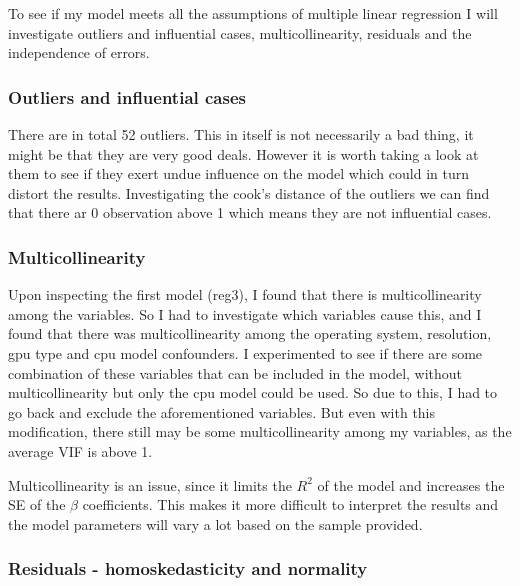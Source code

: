 \documentclass[
]{article}
\begin{document}
To see if my model meets all the assumptions of multiple linear
regression I will investigate outliers and influential cases,
multicollinearity, residuals and the independence of errors.

\hypertarget{outliers-and-influential-cases}{%
\subsubsection{Outliers and influential
cases}\label{outliers-and-influential-cases}}

There are in total 52 outliers. This in itself is not necessarily a bad
thing, it might be that they are very good deals. However it is worth
taking a look at them to see if they exert undue influence on the model
which could in turn distort the results. Investigating the cook's
distance of the outliers we can find that there ar 0 observation above 1
which means they are not influential cases.

\hypertarget{multicollinearity}{%
\subsubsection{Multicollinearity}\label{multicollinearity}}

Upon inspecting the first model (reg3), I found that there is
multicollinearity among the variables. So I had to investigate which
variables cause this, and I found that there was multicollinearity among
the operating system, resolution, gpu type and cpu model confounders. I
experimented to see if there are some combination of these variables
that can be included in the model, without multicollinearity but only
the cpu model could be used. So due to this, I had to go back and
exclude the aforementioned variables. But even with this modification,
there still may be some multicollinearity among my variables, as the
average VIF is above 1.

Multicollinearity is an issue, since it limits the \(R^2\) of the model
and increases the SE of the \(\beta\) coefficients. This makes it more
difficult to interpret the results and the model parameters will vary a
lot based on the sample provided.

\hypertarget{residuals---homoskedasticity-and-normality}{%
\subsubsection{Residuals - homoskedasticity and
normality}\label{residuals---homoskedasticity-and-normality}}
\end{document}
